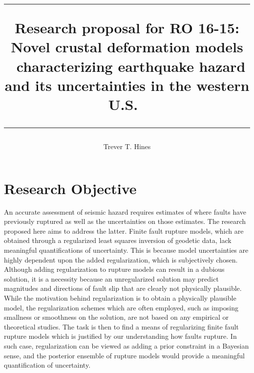 \documentclass[12pt]{article}
\title{	
 \rule{\headwidth}{1.0pt}
 Research proposal for RO 16-15:
 Novel crustal deformation models \
 characterizing earthquake hazard and its uncertainties in the western U.S.\
 \rule{\headwidth}{1.0pt}
 \author{Trever T. Hines}}
\begin{document}
\maketitle

\section*{Research Objective}
An accurate assessment of seismic hazard requires estimates of where faults have previously ruptured as well as the uncertainties on those estimates.  The research proposed here aims to address the latter. Finite fault rupture models, which are obtained through a regularized least squares inversion of geodetic data, lack meaningful quantifications of uncertainty. This is because model uncertainties are highly dependent upon the added regularization, which is subjectively chosen.  Although adding regularization to rupture models can result in a dubious solution, it is a necessity because an unregularized  solution may predict magnitudes and directions of fault slip that are clearly not physically plausible.  While the motivation behind regularization is to obtain a physically plausible model, the regularization schemes which are often employed, such as imposing smallness or smoothness on the solution, are not based on any empirical or theoretical studies.  The task is then to find a means of regularizing finite fault rupture models which is justified by our understanding how faults rupture.  In such case, regularization can be viewed as adding a prior constraint in a Bayesian sense, and the posterior ensemble of rupture models would provide a meaningful quantification of uncertainty.
\end{document}
